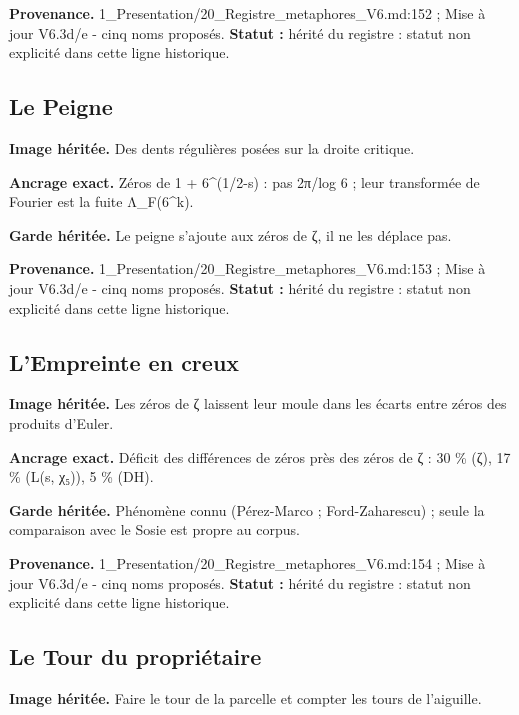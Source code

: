 \documentclass[
  9pt,
  a4paper,
]{article}
\begin{document}
\textbf{Provenance.} 1\_Presentation/20\_Registre\_metaphores\_V6.md:152
; Mise à jour V6.3d/e - cinq noms proposés. \textbf{Statut :} hérité du
registre : statut non explicité dans cette ligne historique.

\hypertarget{le-peigne}{%
\subsection{Le Peigne}\label{le-peigne}}

\textbf{Image héritée.} Des dents régulières posées sur la droite
critique.

\textbf{Ancrage exact.} Zéros de 1 + 6\^{}(1/2-s) : pas 2π/log 6 ; leur
transformée de Fourier est la fuite Λ\_F(6\^{}k).

\textbf{Garde héritée.} Le peigne s'ajoute aux zéros de ζ, il ne les
déplace pas.

\textbf{Provenance.} 1\_Presentation/20\_Registre\_metaphores\_V6.md:153
; Mise à jour V6.3d/e - cinq noms proposés. \textbf{Statut :} hérité du
registre : statut non explicité dans cette ligne historique.

\hypertarget{lempreinte-en-creux}{%
\subsection{L'Empreinte en creux}\label{lempreinte-en-creux}}

\textbf{Image héritée.} Les zéros de ζ laissent leur moule dans les
écarts entre zéros des produits d'Euler.

\textbf{Ancrage exact.} Déficit des différences de zéros près des zéros
de ζ : 30 \% (ζ), 17 \% (L(s, χ₅)), 5 \% (DH).

\textbf{Garde héritée.} Phénomène connu (Pérez-Marco ; Ford-Zaharescu) ;
seule la comparaison avec le Sosie est propre au corpus.

\textbf{Provenance.} 1\_Presentation/20\_Registre\_metaphores\_V6.md:154
; Mise à jour V6.3d/e - cinq noms proposés. \textbf{Statut :} hérité du
registre : statut non explicité dans cette ligne historique.

\hypertarget{le-tour-du-propriuxe9taire}{%
\subsection{Le Tour du propriétaire}\label{le-tour-du-propriuxe9taire}}

\textbf{Image héritée.} Faire le tour de la parcelle et compter les
tours de l'aiguille.
\end{document}
